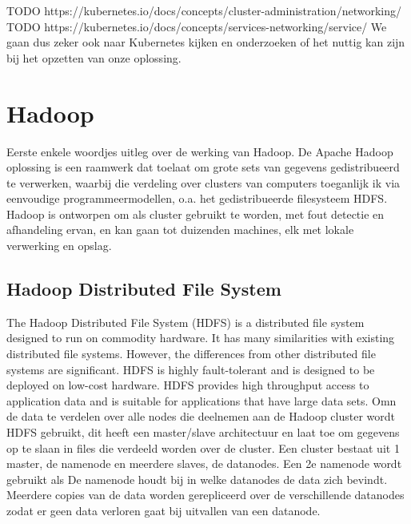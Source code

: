 TODO https://kubernetes.io/docs/concepts/cluster-administration/networking/
TODO https://kubernetes.io/docs/concepts/services-networking/service/
\newline
\newline
We gaan dus zeker ook naar Kubernetes kijken en onderzoeken of het nuttig kan zijn bij het opzetten van onze oplossing.

\section{Hadoop}
Eerste enkele woordjes uitleg over de werking van Hadoop.
\newline
\newline
De Apache Hadoop oplossing is een raamwerk dat toelaat om grote sets van gegevens gedistribueerd te verwerken, waarbij die verdeling over clusters van computers toeganlijk ik via eenvoudige programmeermodellen, o.a. het gedistribueerde filesysteem HDFS.
\newline
Hadoop is ontworpen om als cluster gebruikt te worden, met fout detectie en afhandeling ervan, en kan gaan tot duizenden machines, elk met lokale verwerking en opslag. \textcite{ASF2022}

\subsection{Hadoop Distributed File System}
The Hadoop Distributed File System (HDFS) is a distributed file system designed to run on commodity hardware. It has many similarities with existing distributed file systems.
However, the differences from other distributed file systems are significant. HDFS is highly fault-tolerant and is designed to be deployed on low-cost hardware. HDFS provides high throughput access to application data and is suitable for applications that have large data sets.\autocite{Borthakur2007a}
\newline
\newline
Omn de data te verdelen over alle nodes die deelnemen aan de Hadoop cluster wordt HDFS gebruikt, dit heeft een master/slave architectuur en laat toe om gegevens op te slaan in files die verdeeld worden over de cluster. Een cluster bestaat uit 1 master, de namenode en meerdere slaves, de datanodes. Een 2e namenode wordt gebruikt als 
\newline
De namenode houdt bij in welke datanodes de data zich bevindt. Meerdere copies van de data worden gerepliceerd over de verschillende datanodes zodat er geen data verloren gaat bij uitvallen van een datanode.

